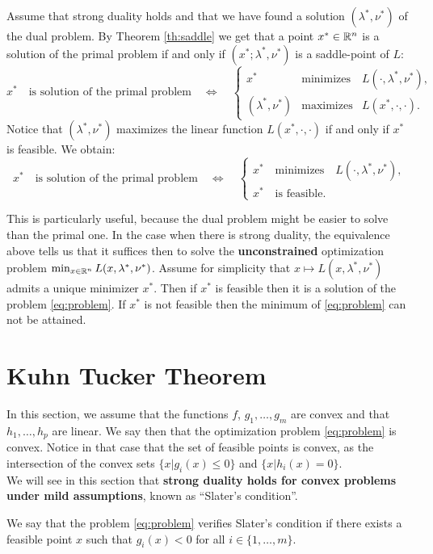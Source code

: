 \documentclass[11pt,nocut]{article}
\begin{document}
Assume that strong duality holds and that we have found a solution $(\lambda^*,\nu^*)$ of the dual problem. 
By Theorem \ref{th:saddle} we get that a point $x^* \in \mathbb{R}^n$ is a solution of the primal problem if and only if $(x^*;\lambda^*,\nu^*)$ is a saddle-point of $L$:
$$
x^* \quad \text{is solution of the primal problem} \quad
\Longleftrightarrow
\quad
\left\{
	\!\!
\begin{array}{lll}
	x^* & \text{minimizes} & L(\cdot, \lambda^*,\nu^*), \\
	(\lambda^*,\nu^*) & \text{maximizes} & L(x^*, \cdot, \cdot).
\end{array}
\right.
$$
Notice that $(\lambda^*,\nu^*)$ maximizes the linear function $L(x^*, \cdot,\cdot)$ if and only if $x^*$ is feasible. We obtain:
$$
x^* \quad \text{is solution of the primal problem} \quad
\Longleftrightarrow
\quad
\begin{cases}
	x^* \quad \text{minimizes} \quad L(\cdot, \lambda^*,\nu^*), \\
	x^* \quad \text{is feasible.}
\end{cases}
$$

This is particularly useful, because the dual problem might be easier to solve than the primal one. In the case when there is strong duality, the equivalence above tells us that it suffices then to solve the \textbf{unconstrained} optimization problem $\min_{x \in \mathbb{R}^n} L(x,\lambda^*,\nu^*)$.
Assume for simplicity that $x \mapsto L(x,\lambda^*,\nu^*)$ admits a unique minimizer $x^*$. Then if $x^*$ is feasible then it is a solution of the problem \eqref{eq:problem}. 
If $x^*$ is not feasible then the minimum of \eqref{eq:problem} can not be attained.

\section{Kuhn Tucker Theorem}

In this section, we assume that the functions $f$, $g_1, \dots, g_m$ are convex and that $h_1, \dots, h_p$ are linear. We say then that the optimization problem \eqref{eq:problem} is convex.
Notice in that case that the set of feasible points is convex, as the intersection of the convex sets $\{x | g_i(x) \leq 0 \}$ and $\{x|h_i(x) =0\}$.
\\

We will see in this section that \textbf{strong duality holds for convex problems under mild assumptions}, known as ``Slater's condition''.


\begin{definition}
	We say that the problem \eqref{eq:problem} verifies Slater's condition if there exists a feasible point $x$ such that $g_i(x) < 0$ for all $i \in \{1, \dots, m\}$.
\end{definition}
\end{document}
